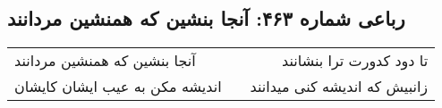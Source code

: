 \begin{center}
\section*{رباعی شماره ۴۶۳: آنجا بنشین که همنشین مردانند}
\label{sec:0463}
\begin{longtable}{l p{0.5cm} r}
آنجا بنشین که همنشین مردانند
&&
تا دود کدورت ترا بنشانند
\\
اندیشه مکن به عیب ایشان کایشان
&&
زانبیش که اندیشه کنی میدانند
\\
\end{longtable}
\end{center}
